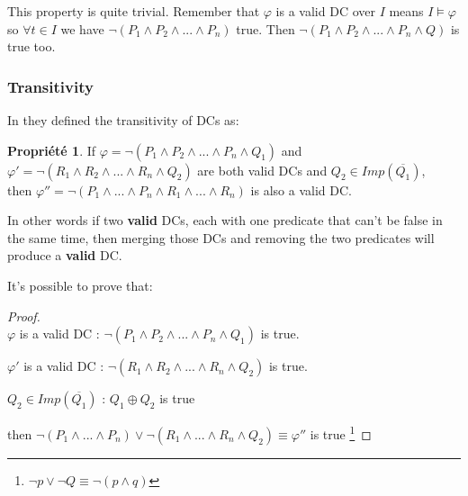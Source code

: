 \documentclass[letterpaper, 12pt]{report}
\theoremstyle{definition}
\newtheorem{myprop}{Propriété}
\begin{document}
This property is quite trivial. Remember that $\varphi$ is a valid DC over $I$ means $I \models \varphi$ so $\forall t \in I$ we have $\neg (P_1 \wedge P_2 \wedge ... \wedge P_n)$ true. Then $\neg (P_1 \wedge P_2 \wedge ... \wedge P_n \wedge Q)$ is true too.
\subsubsection{Transitivity}
In \cite{DCs} they defined the transitivity of DCs as:

\begin{myprop}
	If $\varphi = \neg (P_1 \wedge P_2 \wedge ... \wedge P_n \wedge Q_1)$ and $\varphi ' = \neg (R_1 \wedge R_2 \wedge ... \wedge R_n \wedge Q_2)$ are both valid DCs and $Q_2 \in Imp(\overline{Q_1})$, \\ then $ \varphi '' = \neg(P_1 \wedge ... \wedge P_n \wedge R_1 \wedge ... \wedge R_n)$ is also a valid DC.
\end{myprop}

In other words if two \textbf{valid} DCs, each with one predicate that can't be false in the same time, then merging those DCs and removing the two predicates will produce a \textbf{valid} DC.

It's possible to prove that:

%	

\begin{proof}~\\
	\hspace*{0.55cm} $\varphi$ is a valid DC : $\neg (P_1 \wedge P_2 \wedge ... \wedge P_n \wedge Q_1)$ is true.
	
	$\varphi '$ is a valid DC : $\neg (R_1 \wedge R_2 \wedge ... \wedge R_n \wedge Q_2)$ is true.
	
	$Q_2 \in Imp(\overline{Q_1})$ : $Q_1 \oplus Q_2$ is true%
	
	then $\neg (P_1 \wedge ... \wedge P_n) \vee \neg (R_1 \wedge ... \wedge R_n \wedge Q_2) \equiv \varphi'' $ is true \footnote{$\neg p \vee \neg Q \equiv \neg (p \wedge q)$}
\end{proof}
\end{document}
